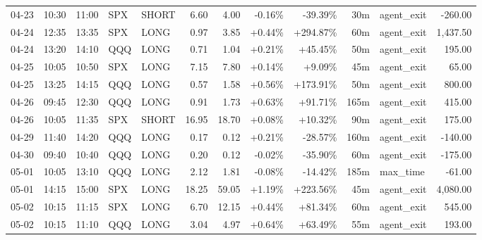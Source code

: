 \documentclass[11pt,a4paper,twoside]{article}
\begin{document}
\begin{center}
\begin{longtable}{>{\color{txtmain}}l l l l l r r r r r >{\color{txtmain}}l r}
04-23 & 10:30 & 11:00 & SPX & SHORT & 6.60 & 4.00 & \textcolor{lossred}{-0.16\%} & \textcolor{lossred}{-39.39\%} & 30m & agent\_exit & \textcolor{lossred}{-260.00} \\
04-24 & 12:35 & 13:35 & SPX & LONG & 0.97 & 3.85 & \textcolor{wingreen}{+0.44\%} & \textcolor{wingreen}{+294.87\%} & 60m & agent\_exit & \textcolor{wingreen}{1,437.50} \\
04-24 & 13:20 & 14:10 & QQQ & LONG & 0.71 & 1.04 & \textcolor{wingreen}{+0.21\%} & \textcolor{wingreen}{+45.45\%} & 50m & agent\_exit & \textcolor{wingreen}{195.00} \\
04-25 & 10:05 & 10:50 & SPX & LONG & 7.15 & 7.80 & \textcolor{wingreen}{+0.14\%} & \textcolor{wingreen}{+9.09\%} & 45m & agent\_exit & \textcolor{wingreen}{65.00} \\
04-25 & 13:25 & 14:15 & QQQ & LONG & 0.57 & 1.58 & \textcolor{wingreen}{+0.56\%} & \textcolor{wingreen}{+173.91\%} & 50m & agent\_exit & \textcolor{wingreen}{800.00} \\
04-26 & 09:45 & 12:30 & QQQ & LONG & 0.91 & 1.73 & \textcolor{wingreen}{+0.63\%} & \textcolor{wingreen}{+91.71\%} & 165m & agent\_exit & \textcolor{wingreen}{415.00} \\
04-26 & 10:05 & 11:35 & SPX & SHORT & 16.95 & 18.70 & \textcolor{wingreen}{+0.08\%} & \textcolor{wingreen}{+10.32\%} & 90m & agent\_exit & \textcolor{wingreen}{175.00} \\
04-29 & 11:40 & 14:20 & QQQ & LONG & 0.17 & 0.12 & \textcolor{wingreen}{+0.21\%} & \textcolor{lossred}{-28.57\%} & 160m & agent\_exit & \textcolor{lossred}{-140.00} \\
04-30 & 09:40 & 10:40 & QQQ & LONG & 0.20 & 0.12 & \textcolor{lossred}{-0.02\%} & \textcolor{lossred}{-35.90\%} & 60m & agent\_exit & \textcolor{lossred}{-175.00} \\
05-01 & 10:05 & 13:10 & QQQ & LONG & 2.12 & 1.81 & \textcolor{lossred}{-0.08\%} & \textcolor{lossred}{-14.42\%} & 185m & max\_time & \textcolor{lossred}{-61.00} \\
05-01 & 14:15 & 15:00 & SPX & LONG & 18.25 & 59.05 & \textcolor{wingreen}{+1.19\%} & \textcolor{wingreen}{+223.56\%} & 45m & agent\_exit & \textcolor{wingreen}{4,080.00} \\
05-02 & 10:15 & 11:15 & SPX & LONG & 6.70 & 12.15 & \textcolor{wingreen}{+0.44\%} & \textcolor{wingreen}{+81.34\%} & 60m & agent\_exit & \textcolor{wingreen}{545.00} \\
05-02 & 10:15 & 11:10 & QQQ & LONG & 3.04 & 4.97 & \textcolor{wingreen}{+0.64\%} & \textcolor{wingreen}{+63.49\%} & 55m & agent\_exit & \textcolor{wingreen}{193.00} \\

\end{longtable}
\end{center}
\end{document}
